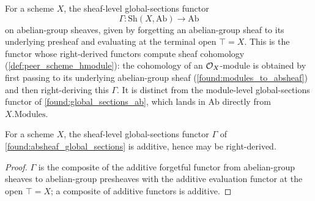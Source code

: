 \begin{definition}
  \label{found:absheaf_global_sections}
  For a scheme \(X\), the sheaf-level global-sections functor
  \[
    \Gamma:\mathrm{Sh}(X,\mathrm{Ab})\to\mathrm{Ab}
  \]
  on abelian-group sheaves, given by forgetting an abelian-group sheaf to its
  underlying presheaf and evaluating at the terminal open \(\top=X\).  This is the
  functor whose right-derived functors compute sheaf cohomology
  (\cref{def:peer_scheme_hmodule}): the cohomology of an \(\mathcal{O}_X\)-module is
  obtained by first passing to its underlying abelian-group sheaf
  (\cref{found:modules_to_absheaf}) and then right-deriving this \(\Gamma\).  It
  is distinct from the module-level global-sections functor of
  \cref{found:global_sections_ab}, which lands in \(\mathrm{Ab}\) directly from
  \(X.\mathrm{Modules}\).
\end{definition}

\begin{lemma}
  \label{found:absheaf_global_sections_additive}
  For a scheme \(X\), the sheaf-level global-sections functor \(\Gamma\) of
  \cref{found:absheaf_global_sections} is additive, hence may be right-derived.
\end{lemma}

\begin{proof}
  \leanok
  \(\Gamma\) is the composite of the additive forgetful functor from
  abelian-group sheaves to abelian-group presheaves with the additive evaluation
  functor at the open \(\top=X\); a composite of additive functors is additive.
\end{proof}

